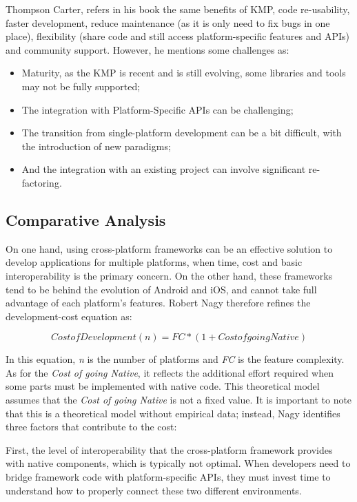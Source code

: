Thompson Carter, refers in his book\cite{kotlinInDepth} the same benefits of KMP, code re-usability, faster development, reduce maintenance (as it is only need to fix bugs in one place), flexibility (share code and still access platform-specific features and APIs) and community support. However, he mentions some challenges as:
\begin{itemize}
	\item Maturity, as the KMP is recent and is still evolving, some libraries and tools may not be fully supported;
	\item The integration with Platform-Specific APIs can be challenging;
	\item The transition from single-platform development can be a bit difficult, with the introduction of new paradigms;
	\item And the integration with an existing project can involve significant re-factoring.
\end{itemize}

\subsection{Comparative Analysis}\label{subsec:overview}

On one hand, using cross-platform frameworks can be an effective solution to develop applications for multiple platforms, when time, cost and basic interoperability is the primary concern. On the other hand, these frameworks tend to be behind the evolution of Android and iOS, and cannot take full advantage of each platform's features. Robert Nagy therefore refines the development-cost equation as:

\[Cost of Development (n) = FC * (1 + Cost of going Native)\]

In this equation, \textit{n} is the number of platforms and \textit{FC} is the feature complexity. As for the \textit{Cost of going Native}, it reflects the additional effort required when some parts must be implemented with native code. This theoretical model assumes that the \textit{Cost of going Native} is not a fixed value. It is important to note that this is a theoretical model without empirical data; instead, Nagy identifies three factors that contribute to the cost:\cite{Nagy2022} 

First, the level of interoperability that the cross-platform framework provides with native components, which is typically not optimal. When developers need to bridge framework code with platform-specific APIs, they must invest time to understand how to properly connect these two different environments.

